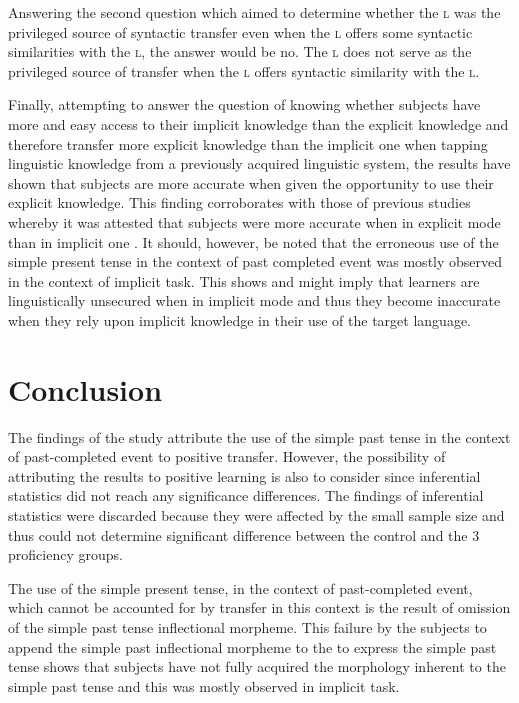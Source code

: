 \documentclass[output=paper,
modfonts
]{langscibook}
\begin{document}
Answering the second question which aimed to determine whether the \textsc{l} was the privileged source of syntactic transfer even when the \textsc{l} offers some syntactic similarities with the \textsc{l}, the answer would be no. The \textsc{l} does not serve as the privileged source of transfer when the \textsc{l} offers syntactic similarity with the \textsc{l}.

Finally, attempting to answer the question of knowing whether subjects have more and easy access to their implicit knowledge than the explicit knowledge and therefore transfer more explicit knowledge than the implicit one when tapping linguistic knowledge from a previously acquired linguistic system, the results have shown that subjects are more accurate when given the opportunity to use their explicit knowledge. This finding corroborates with those of previous studies whereby it was attested that subjects were more accurate when in explicit mode than in implicit one \citep{Schmidt2001,Schmidt1995,Leow1998,Robinson1997}. It should, however, be noted that the erroneous use of the simple present tense in the context of past completed event was mostly observed in the context of implicit task. This shows and might imply that learners are linguistically unsecured when in implicit mode and thus they become inaccurate when they rely upon implicit knowledge in their use of the target language.

\section{Conclusion}\label{sec:kabasele:8}

The findings of the study attribute the use of the simple past tense in the context of past-completed event to positive transfer. However, the possibility of attributing the results to positive learning is also to consider since inferential statistics did not reach any significance differences. The findings of inferential statistics were discarded because they were affected by the small sample size and thus could not determine significant difference between the control and the 3 proficiency groups. 

The use of the simple present tense, in the context of past-completed event, which cannot be accounted for by transfer in this context is the result of omission of the simple past tense inflectional morpheme. This failure by the subjects to append the simple past inflectional morpheme to the  to express the simple past tense shows that subjects have not fully acquired the morphology inherent to the simple past tense and this was mostly observed in implicit task.
\end{document}
